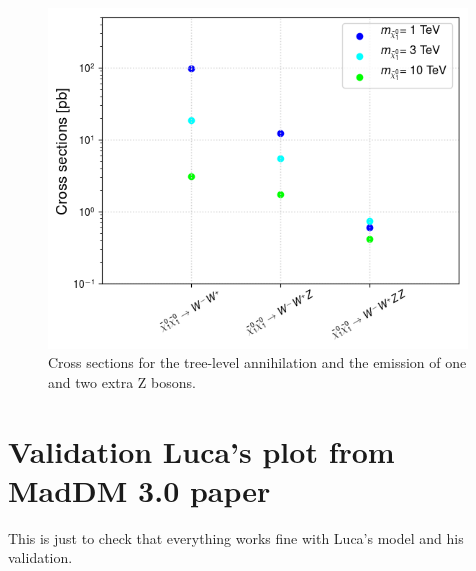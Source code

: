 \documentclass[epj,nopacs,fleqn]{svjour}
\begin{document}
\begin{figure}[!h]
	\centering
	
 \includegraphics[width=0.99\textwidth]{Fig/Validation_1009/xsections_minimalDmwinolike.png}  
	
	\caption{Cross sections for the tree-level annihilation and the emission of one and two extra Z bosons. }
	\label{xsection_winolike}
\end{figure}



\clearpage
\section{Validation Luca's plot from MadDM 3.0 paper}
This is just to check that everything works fine with Luca's model and his validation.
\end{document}
